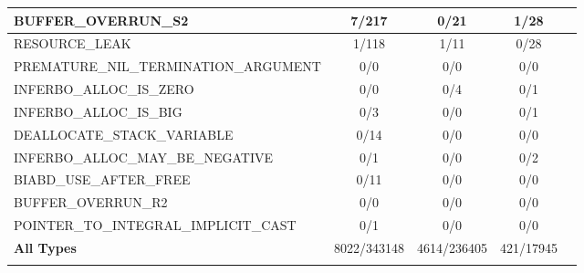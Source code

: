 \begin{table}[ht]
\begin{tabular}{!{\vrule width 1pt}l!{\vrule width 1pt}c|c|c!{\vrule width 1pt}c!{\vrule width 1pt}}
         {\scriptsize BUFFER\_OVERRUN\_S2}&    {\footnotesize 7/217}&  {\footnotesize 0/21}&  {\footnotesize 1/28}\\ \hline
         {\scriptsize RESOURCE\_LEAK}&         {\footnotesize 1/118}&  {\footnotesize 1/11}&  {\footnotesize 0/28}\\ \hline
         {\scriptsize PREMATURE\_NIL\_TERMINATION\_ARGUMENT}&  {\footnotesize 0/0}&  {\footnotesize 0/0}&  {\footnotesize 0/0}\\ \hline
         {\scriptsize INFERBO\_ALLOC\_IS\_ZERO}&           {\footnotesize 0/0}&  {\footnotesize 0/4}&  {\footnotesize 0/1}\\ \hline
         {\scriptsize INFERBO\_ALLOC\_IS\_BIG}&            {\footnotesize 0/3}&  {\footnotesize 0/0}&  {\footnotesize 0/1}\\ \hline
         {\scriptsize DEALLOCATE\_STACK\_VARIABLE}&        {\footnotesize 0/14}&  {\footnotesize 0/0}&  {\footnotesize 0/0}\\ \hline
         {\scriptsize INFERBO\_ALLOC\_MAY\_BE\_NEGATIVE}&  {\footnotesize 0/1}&  {\footnotesize 0/0}&  {\footnotesize 0/2}\\ \hline
         {\scriptsize BIABD\_USE\_AFTER\_FREE}&            {\footnotesize 0/11}&  {\footnotesize 0/0}&  {\footnotesize 0/0}\\ \hline
         {\scriptsize BUFFER\_OVERRUN\_R2}&                {\footnotesize 0/0}&  {\footnotesize 0/0}&  {\footnotesize 0/0}\\ \hline
         {\scriptsize POINTER\_TO\_INTEGRAL\_IMPLICIT\_CAST}&  {\footnotesize 0/1}&  {\footnotesize 0/0}&  {\footnotesize 0/0}\\
         {\footnotesize \textbf{All Types}}&  {\footnotesize 8022/343148}&  {\footnotesize 4614/236405}&  {\footnotesize 421/17945}\\
    \end{tabular}
    \label{tab:d2a-bug-types1}
\end{table}

